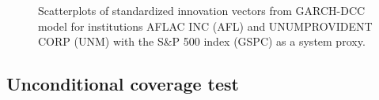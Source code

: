\begin{figure}[ht]
  \centering
\caption{Scatterplots of standardized innovation vectors from GARCH-DCC model for institutions AFLAC INC (AFL) and UNUMPROVIDENT CORP (UNM) with the S\&P 500 index (GSPC) as a system proxy.}
  \label{sc_dcc}
\end{figure}


\clearpage


\begin{landscape}
\section{Unconditional coverage test}
\label{uncon}


\end{landscape}
